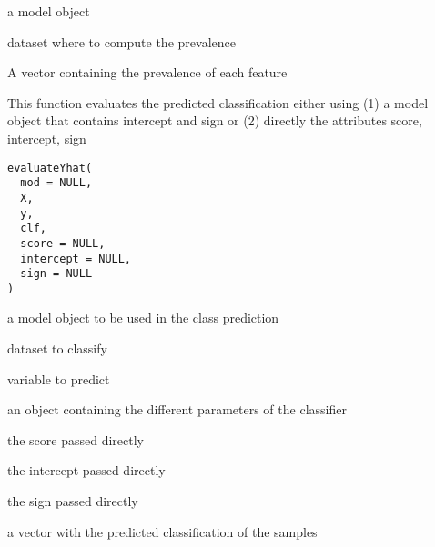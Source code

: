 \documentclass[a4paper]{book}
\begin{document}
%
\begin{Arguments}
\begin{ldescription}
\item[\code{mod:}] a model object

\item[\code{X:}] dataset where to compute the prevalence
\end{ldescription}
\end{Arguments}
%
\begin{Value}
A vector containing the prevalence of each feature
\end{Value}
%
\begin{Description}
This function evaluates the predicted classification either using (1) a model object that contains intercept and sign or (2) directly the attributes score, intercept, sign
\end{Description}
%
\begin{Usage}
\begin{verbatim}
evaluateYhat(
  mod = NULL,
  X,
  y,
  clf,
  score = NULL,
  intercept = NULL,
  sign = NULL
)
\end{verbatim}
\end{Usage}
%
\begin{Arguments}
\begin{ldescription}
\item[\code{mod:}] a model object to be used in the class prediction

\item[\code{X:}] dataset to classify

\item[\code{y:}] variable to predict

\item[\code{clf:}] an object containing the different parameters of the classifier

\item[\code{score:}] the score passed directly

\item[\code{intercept:}] the intercept passed directly

\item[\code{sign:}] the sign passed directly
\end{ldescription}
\end{Arguments}
%
\begin{Value}
a vector with the predicted classification of the samples
\end{Value}
\end{document}
